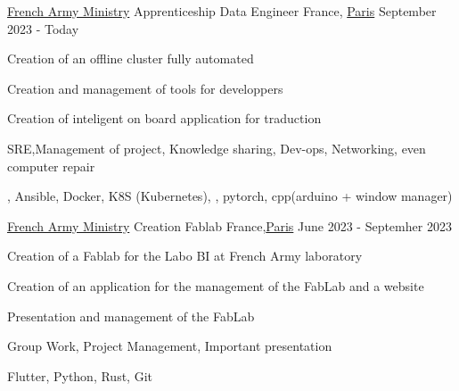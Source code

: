 

\begin{cventries}

	\cventry
	{\href{https://www.defense.gouv.fr/}{French Army Ministry}}
	{Apprenticeship Data Engineer} %
	{France, \href{https://www.paris.fr/}{Paris}} %
	{September 2023 - Today} %
	{
		\begin{cvitems} %
			\item {Creation of an offline cluster fully automated}
			\item {Creation and management of tools for developpers}
			\item {Creation of inteligent on board application for traduction}
		\end{cvitems}
	}
	{
		\begin{cvitemsskills} %
			\item {SRE,Management of project, Knowledge sharing, Dev-ops, Networking, even computer repair}
			\item {\linux, Ansible, Docker, K8S (Kubernetes), \python, pytorch, cpp(arduino + window manager)}
		\end{cvitemsskills}
	}

	\cventry
	{\href{https://www.defense.gouv.fr/}{French Army Ministry}}
	{Creation Fablab} %
	{France,\href{https://www.paris.fr/}{Paris}} %
	{June 2023 - Septemher 2023} %
	{
		\begin{cvitems} %
			\item {Creation of a Fablab for the Labo BI at French Army laboratory}
			\item {Creation of an application for the management of the FabLab and a website}
			\item {Presentation and management of the FabLab}
		\end{cvitems}
	}
	{
		\begin{cvitemsskills} %
			\item {Group Work, Project Management, Important presentation}
			\item {Flutter, Python, Rust, Git }
		\end{cvitemsskills}
	}


\end{cventries}
